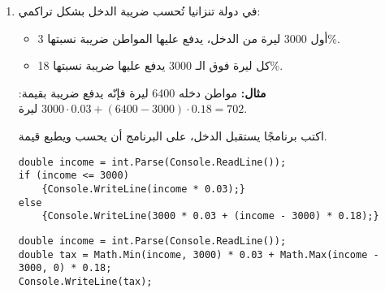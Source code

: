 ﻿\documentclass[12pt]{article}
\begin{document}
\begin{enumerate}[itemsep=2em]
\item
في دولة تنزانيا تُحسب ضريبة الدخل بشكل تراكمي:
\begin{itemize}
    \item أول 3000 ليرة من الدخل، يدفع عليها المواطن ضريبة نسبتها 3\%.
    \item كل ليرة فوق الـ 3000 يدفع عليها ضريبة نسبتها 18\%.
\end{itemize}
\textbf{مثال:} مواطن دخله 6400 ليرة فإنّه يدفع ضريبة بقيمة: $3000 \cdot 0.03 + (6400 - 3000) \cdot 0.18 = 702$ ليرة.

اكتب برنامجًا يستقبل الدخل، على البرنامج أن يحسب ويطبع قيمة.

\ifwithsols
\begin{boxSolution}[1]
\begin{english}
\begin{verbatim}
double income = int.Parse(Console.ReadLine());
if (income <= 3000)
    {Console.WriteLine(income * 0.03);}
else
    {Console.WriteLine(3000 * 0.03 + (income - 3000) * 0.18);}
\end{verbatim}
\end{english}
\end{boxSolution}
\begin{boxSolution}[2]
\begin{english}
\begin{verbatim}
double income = int.Parse(Console.ReadLine());
double tax = Math.Min(income, 3000) * 0.03 + Math.Max(income - 3000, 0) * 0.18;
Console.WriteLine(tax);
\end{verbatim}
\end{english}
\end{boxSolution}
\fi


\end{enumerate}
\end{document}
